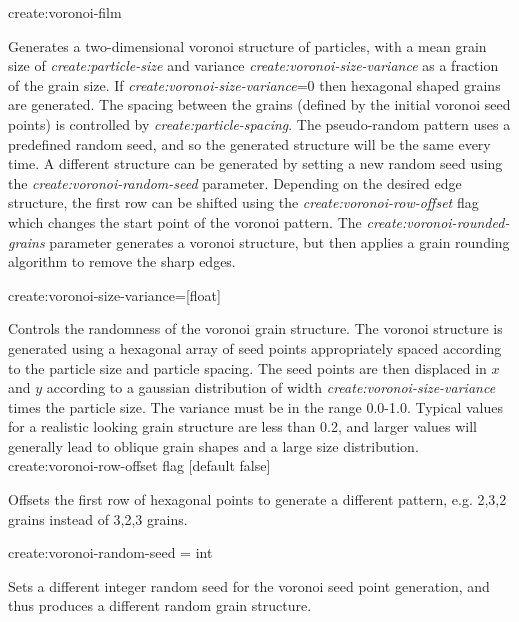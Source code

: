 {\zicf create:voronoi-film} Generates a two-dimensional voronoi structure of particles, with a mean grain size of \textit{create:particle-size} and variance \textit{create:voronoi-size-variance} as a fraction of the grain size. If \textit{create:voronoi-size-variance}=0 then hexagonal shaped grains are generated. The spacing between the grains (defined by the initial voronoi seed points) is controlled by \textit{create:particle-spacing}. The pseudo-random pattern uses a predefined random seed, and so the generated structure will be the same every time. A different structure can be generated by setting a new random seed using the \textit{create:voronoi-random-seed} parameter. Depending on the desired edge structure, the first row can be shifted using the \textit{create:voronoi-row-offset} flag which changes the start point of the voronoi pattern. The \textit{create:voronoi-rounded-grains} parameter generates a voronoi structure, but then applies a grain rounding algorithm to remove the sharp edges.\\ \par

{\zicf create:voronoi-size-variance=[float]} Controls the randomness of the voronoi grain structure. The voronoi structure is generated using a hexagonal array of seed points appropriately spaced according to the particle size and particle spacing. The seed points are then displaced in $x$ and $y$ according to a gaussian distribution of width \textit{create:voronoi-size-variance} times the particle size. The variance must be in the range 0.0-1.0. Typical values for a realistic looking grain structure are less than 0.2, and larger values will generally lead to oblique grain shapes and a large size distribution.\\ 

{\zicf create:voronoi-row-offset flag [default false]} Offsets the first row of hexagonal points to generate a different pattern, e.g. 2,3,2 grains instead of 3,2,3 grains.\\ \par

{\zicf create:voronoi-random-seed = int} Sets a different integer random seed for the voronoi seed point generation, and thus produces a different random grain structure.\\ \par

